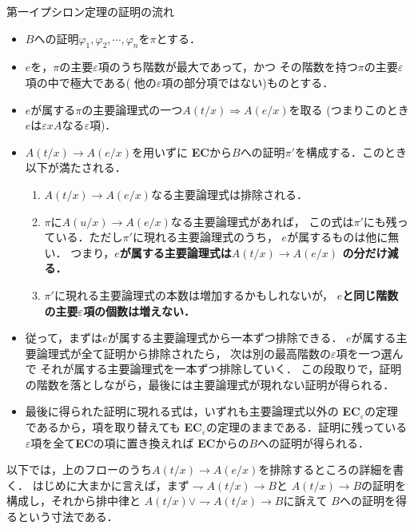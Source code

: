 	\begin{itembox}[l]{第一イプシロン定理の証明の流れ}
		\begin{itemize}
			\item $B$への証明$\varphi_{1},\varphi_{2},\cdots,\varphi_{n}$を$\pi$とする．
			\item $e$を，$\pi$の主要$\varepsilon$項のうち階数が最大であって，かつ
				その階数を持つ$\pi$の主要$\varepsilon$項の中で極大である(
				他の$\varepsilon$項の部分項ではない)ものとする．
			\item $e$が属する$\pi$の主要論理式の一つ$A(t/x) \Longrightarrow A(e/x)$を取る
				(つまりこのとき$e$は$\varepsilon x A$なる$\varepsilon$項)．
			\item $A(t/x) \rightarrow A(e/x)$を用いずに
				{\bf EC}から$B$への証明$\pi'$を構成する．このとき以下が満たされる．
				\begin{enumerate}
					\item $A(t/x) \rightarrow A(e/x)$なる主要論理式は排除される．
					\item $\pi$に$A(u/x) \rightarrow A(e/x)$なる主要論理式があれば，
						この式は$\pi'$にも残っている．ただし$\pi'$に現れる主要論理式のうち，
						$e$が属するものは他に無い．
						つまり，{\bf $e$が属する主要論理式は$A(t/x) \rightarrow A(e/x)$
						の分だけ減る．}
					\item $\pi'$に現れる主要論理式の本数は増加するかもしれないが，
						{\bf $e$と同じ階数の主要$\varepsilon$項の個数は増えない．}
				\end{enumerate}
			
			\item 従って，まずは$e$が属する主要論理式から一本ずつ排除できる．
				$e$が属する主要論理式が全て証明から排除されたら，
				次は別の最高階数の$\varepsilon$項を一つ選んで
				それが属する主要論理式を一本ずつ排除していく．
				この段取りで，証明の階数を落としながら，最後には主要論理式が現れない証明が得られる．
					
			\item 最後に得られた証明に現れる式は，いずれも主要論理式以外の
				{\bf EC}${}_{\varepsilon}$の定理であるから，項を取り替えても
				{\bf EC}${}_{\varepsilon}$の定理のままである．証明に残っている
				$\varepsilon$項を全て{\bf EC}の項に置き換えれば
				{\bf EC}からの$B$への証明が得られる．
		\end{itemize}
	\end{itembox}
	
	以下では，上のフローのうち$A(t/x) \rightarrow A(e/x)$を排除するところの詳細を書く．
	はじめに大まかに言えば，まず$\rightharpoondown A(t/x) \rightarrow B$と
	$A(t/x) \rightarrow B$の証明を構成し，それから排中律と
	$A(t/x) \vee \rightharpoondown A(t/x) \rightarrow B$に訴えて
	$B$への証明を得るという寸法である．
	
